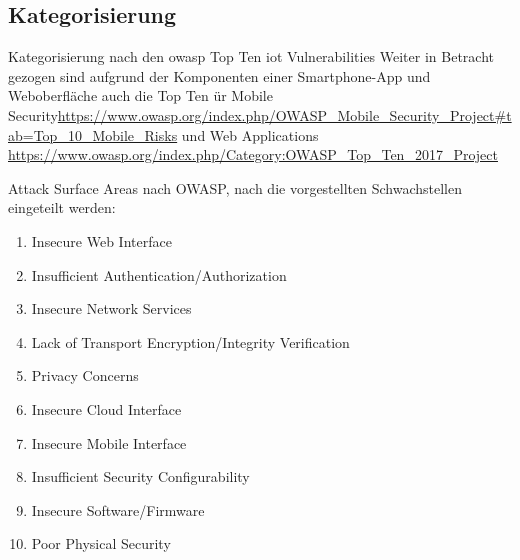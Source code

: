 \subsection{Kategorisierung}
    Kategorisierung nach den \gls{owasp} Top Ten \gls{iot} Vulnerabilities
    Weiter in Betracht gezogen sind aufgrund der Komponenten einer Smartphone-App und Weboberfläche auch die Top Ten ür Mobile Security\sloppy\url{https://www.owasp.org/index.php/OWASP_Mobile_Security_Project#tab=Top_10_Mobile_Risks} und Web Applications \sloppy\url{https://www.owasp.org/index.php/Category:OWASP_Top_Ten_2017_Project}
    
    
    Attack Surface Areas nach OWASP, nach die vorgestellten Schwachstellen eingeteilt werden:
    \begin{enumerate}[noitemsep]
        \item Insecure Web Interface
        \item Insufficient Authentication/Authorization
        \item Insecure Network Services
        \item Lack of Transport Encryption/Integrity Verification
        \item Privacy Concerns
        \item Insecure Cloud Interface
        \item Insecure Mobile Interface
        \item Insufficient Security Configurability
        \item Insecure Software/Firmware
        \item Poor Physical Security
    \end{enumerate}